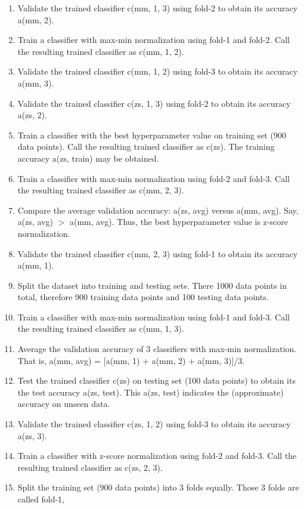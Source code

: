 \documentclass[12pt,a4paper]{article}
\begin{document}
\begin{enumerate}
  \item Validate the trained classifier c(mm, 1, 3) using fold-2 to obtain its accuracy a(mm, 2).
  \item Train a classifier with max-min normalization using fold-1 and fold-2. Call the resulting
        trained classifier as c(mm, 1, 2).
  \item Validate the trained classifier c(mm, 1, 2) using fold-3 to obtain its accuracy a(mm, 3).
  \item Validate the trained classifier c(zs, 1, 3) using fold-2 to obtain its accuracy a(zs, 2).
  \item Train a classifier with the best hyperparameter value on training set (900 data points). Call
        the resulting trained classifier as c(zs). The training accuracy a(zs, train) may be obtained.
  \item Train a classifier with max-min normalization using fold-2 and fold-3. Call the resulting
        trained classifier as c(mm, 2, 3).
  \item Compare the average validation accuracy: a(zs, avg) versus a(mm, avg).
        Say, a(zs, avg) $>$ a(mm, avg). Thus, the best hyperparameter value is z-score normalization.
  \item Validate the trained classifier c(mm, 2, 3) using fold-1 to obtain its accuracy a(mm, 1).
  \item Split the dataset into training and testing sets. There 1000 data points in total, therefore 900
        training data points and 100 testing data points.
  \item Train a classifier with max-min normalization using fold-1 and fold-3. Call the resulting
        trained classifier as c(mm, 1, 3).
  \item Average the validation accuracy of 3 classifiers with max-min normalization.
        That is, a(mm, avg) = [a(mm, 1) + a(mm, 2) + a(mm, 3)]/3.
  \item Test the trained classifier c(zs) on testing set (100 data points) to obtain its the test accuracy
        a(zs, test). This a(zs, test) indicates the (approximate) accuracy on unseen data.
  \item Validate the trained classifier c(zs, 1, 2) using fold-3 to obtain its accuracy a(zs, 3).
  \item Train a classifier with z-score normalization using fold-2 and fold-3. Call the resulting trained
        classifier as c(zs, 2, 3).
  \item Split the training set (900 data points) into 3 folds equally. Those 3 folds are called fold-1,

\end{enumerate}
\end{document}
